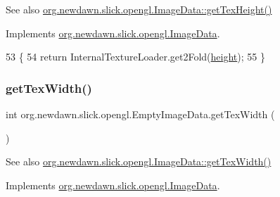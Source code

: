 \begin{DoxySeeAlso}{See also}
\mbox{\hyperlink{interfaceorg_1_1newdawn_1_1slick_1_1opengl_1_1_image_data_a316891c94ba43967d0554378c7197324}{org.\+newdawn.\+slick.\+opengl.\+Image\+Data\+::get\+Tex\+Height()}} 
\end{DoxySeeAlso}


Implements \mbox{\hyperlink{interfaceorg_1_1newdawn_1_1slick_1_1opengl_1_1_image_data_a316891c94ba43967d0554378c7197324}{org.\+newdawn.\+slick.\+opengl.\+Image\+Data}}.


\begin{DoxyCode}
53                               \{
54         \textcolor{keywordflow}{return} InternalTextureLoader.get2Fold(\mbox{\hyperlink{classorg_1_1newdawn_1_1slick_1_1opengl_1_1_empty_image_data_a190ee87309a0084066aad436a0fc267c}{height}});
55     \}
\end{DoxyCode}
\mbox{\label{classorg_1_1newdawn_1_1slick_1_1opengl_1_1_empty_image_data_ad261b00a724191075cff314442c14baa}} 
\subsubsection{\texorpdfstring{get\+Tex\+Width()}{getTexWidth()}}
{\footnotesize\ttfamily int org.\+newdawn.\+slick.\+opengl.\+Empty\+Image\+Data.\+get\+Tex\+Width (\begin{DoxyParamCaption}{ }\end{DoxyParamCaption})\hspace{0.3cm}{\ttfamily [inline]}}

\begin{DoxySeeAlso}{See also}
\mbox{\hyperlink{interfaceorg_1_1newdawn_1_1slick_1_1opengl_1_1_image_data_abf26e8dcbf2ec52f9a49535d8912263e}{org.\+newdawn.\+slick.\+opengl.\+Image\+Data\+::get\+Tex\+Width()}} 
\end{DoxySeeAlso}


Implements \mbox{\hyperlink{interfaceorg_1_1newdawn_1_1slick_1_1opengl_1_1_image_data_abf26e8dcbf2ec52f9a49535d8912263e}{org.\+newdawn.\+slick.\+opengl.\+Image\+Data}}.


